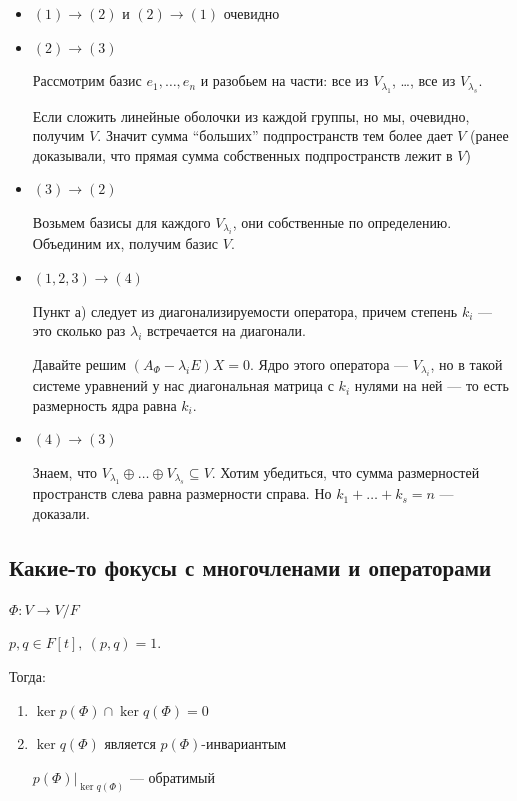 \begin{itemize}
    \item
        \( (1) \to (2) \) и \( (2) \to (1) \) очевидно
    \item
        \( (2) \to (3) \)

        Рассмотрим базис \( e_1, \ldots, e_n \) и разобьем на части:
        все из \( V_{\lambda_1} \), \ldots, все из \( V_{\lambda_s} \).

        Если сложить линейные оболочки из каждой группы, но мы, очевидно, получим \( V \).
        Значит сумма ``больших'' подпространств тем более дает \( V \)
        (ранее доказывали, что прямая сумма собственных подпространств лежит в \( V \))
    \item
        \( (3) \to (2) \)

        Возьмем базисы для каждого \( V_{\lambda_i} \), они собственные по определению.
        Объединим их, получим базис \( V \).
    \item
        \( (1, 2, 3) \to (4) \)

        Пункт а) следует из диагонализируемости оператора,
        причем степень \( k_i \) --- это сколько раз \( \lambda_i \)
        встречается на диагонали.

        Давайте решим \( (A_{\Phi} - \lambda_i E) X = 0 \).
        Ядро этого оператора --- \( V_{\lambda_i} \),
        но в такой системе уравнений у нас диагональная матрица
        с \( k_i \) нулями на ней --- то есть размерность ядра равна \( k_i \).
    \item
        \( (4) \to (3) \)

        Знаем, что \( V_{\lambda_1} \oplus \ldots \oplus V_{\lambda_s} \subseteq V \).
        Хотим убедиться, что сумма размерностей пространств слева равна размерности справа.
        Но \( k_1 + \ldots + k_s = n \) --- доказали.
\end{itemize}

\subsection{Какие-то фокусы с многочленами и операторами}

\begin{lemma}{}{}
    \( \Phi : V \to V / F \)

    \( p, q \in F[t], \: (p, q) = 1 \).

    Тогда:
    \begin{enumerate}
        \item
            \( \ker p(\Phi) \cap \ker q(\Phi) = 0 \)
        \item
            \( \ker q(\Phi) \) является \( p(\Phi) \)-инвариантым

            \( p(\Phi)|_{\ker q(\Phi)} \) --- обратимый
    \end{enumerate}
\end{lemma}

